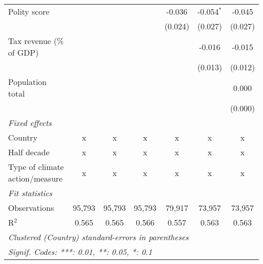 \begin{tabular}{lcccccc}
   Polity score                                                  &         &               &                & -0.036         & -0.054$^{*}$   & -0.045\\   
                                                                 &         &               &                & (0.024)        & (0.027)        & (0.027)\\   
   Tax revenue (\% of GDP)                                       &         &               &                &                & -0.016         & -0.015\\   
                                                                 &         &               &                &                & (0.013)        & (0.012)\\   
   Population total                                              &         &               &                &                &                & 0.000\\   
                                                                 &         &               &                &                &                & (0.000)\\   
   \emph{Fixed effects}\\
   Country                                                       & x       & x             & x              & x              & x              & x\\  
   Half decade                                                   & x       & x             & x              & x              & x              & x\\  
   Type of climate action/measure                                & x       & x             & x              & x              & x              & x\\  
   \midrule \emph{Fit statistics}\\
   Observations                                                  & 95,793  & 95,793        & 95,793         & 79,917         & 73,957         & 73,957\\  
   R$^2$                                                         & 0.565   & 0.565         & 0.566          & 0.557          & 0.563          & 0.563\\  
   \midrule
   \multicolumn{7}{l}{\emph{Clustered (Country) standard-errors in parentheses}}\\
   \multicolumn{7}{l}{\emph{Signif. Codes: ***: 0.01, **: 0.05, *: 0.1}}\\
\end{tabular}
\par\endgroup


